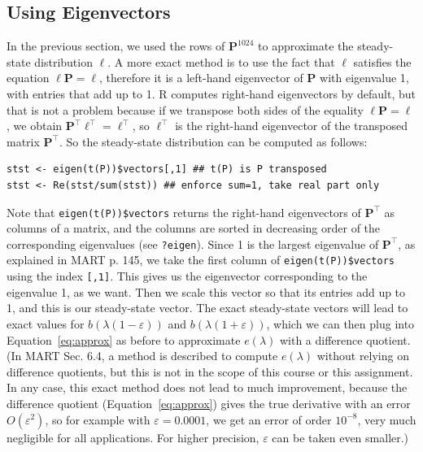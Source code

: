 \documentclass{article}
\begin{document}
\subsection{Using Eigenvectors}
 
In the previous section, we used the rows of $\mathbf{P}^{1024}$ to approximate the steady-state distribution $\ell$. A more exact method is to use the fact that $\ell$ satisfies the equation $\ell \mathbf{P} = \ell$, therefore it is a left-hand eigenvector of $\mathbf{P}$ with eigenvalue 1, with entries that add up to 1. R computes right-hand eigenvectors by default, but that is not a problem because if we transpose both sides of the equality $\ell \mathbf{P} = \ell$, we obtain $\mathbf{P}^\top \ell^\top = \ell^\top$, so $\ell^\top$ is the right-hand eigenvector of the transposed matrix $\mathbf{P}^\top$. So the steady-state distribution can be computed as follows:
 
\begin{lstlisting}
stst <- eigen(t(P))$vectors[,1] ## t(P) is P transposed
stst <- Re(stst/sum(stst)) ## enforce sum=1, take real part only
\end{lstlisting}
Note that \texttt{eigen(t(P))\$vectors} returns the right-hand eigenvectors of $\mathbf{P}^\top$ as columns of a matrix, and the columns are sorted in decreasing order of the corresponding eigenvalues (see \texttt{?eigen}). Since 1 is the largest eigenvalue of $\mathbf{P}^\top$, as explained in MART p. 145, we take the first column of \texttt{eigen(t(P))\$vectors} using the index \texttt{[,1]}. This gives us the eigenvector corresponding to the eigenvalue 1, as we want. Then we scale this vector so that its entries add up to 1, and this is our steady-state vector. \newline \newline
The exact steady-state vectors will lead to exact values for $b(\lambda(1-\varepsilon))$ and $b(\lambda(1+\varepsilon))$, which we can then plug into Equation~\ref{eq:approx} as before to approximate $e(\lambda)$ with a difference quotient. \newline \newline
(In MART Sec. 6.4, a method is described to compute $e(\lambda)$ without relying on difference quotients, but this is not in the scope of this course or this assignment. In any case, this exact method does not lead to much improvement, because the difference quotient (Equation~\ref{eq:approx}) gives the true derivative with an error $O(\varepsilon^2)$, so for example with $\varepsilon = 0.0001$, we get an error of order $10^{-8}$, very much negligible for all applications. For higher precision, $\varepsilon$ can be taken even smaller.)
\end{document}
